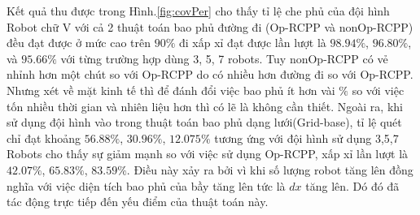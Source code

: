 Kết quả thu được trong Hình.\ref{fig:covPer} cho thấy tỉ lệ che phủ của đội hình Robot chữ V với cả 2 thuật toán bao phủ đường đi (Op-RCPP và nonOp-RCPP) đều đạt được ở mức cao trên $90\%$ đi xấp xỉ đạt được lần lượt là $98.94\%$, $96.80\%$, và $95.66\%$ với từng trường hợp dùng 3, 5, 7 robots. Tuy nonOp-RCPP có vẻ nhỉnh hơn một chút so với Op-RCPP do có nhiều hơn đường đi so với Op-RCPP. Nhưng xét về mặt kinh tế thì để đánh đổi việc bao phủ ít hơn vài $\%$ so với việc tốn nhiều thời gian và nhiên liệu hơn thì có lẽ là không cần thiết. 
Ngoài ra, khi sử dụng đội hình vào trong thuật toán bao phủ dạng lưới(Grid-base), tỉ lệ quét chỉ đạt khoảng $56.88\%$, $30.96\%$, $12.075\%$ tương ứng với đội hình sử dụng 3,5,7 Robots cho thấy sự giảm mạnh so với việc sử dụng Op-RCPP, xấp xỉ lần lượt là $42.07\%$, $65.83\%$, $83.59\%$. Điều này xảy ra bởi vì khi số lượng robot tăng lên đồng nghĩa với việc diện tích bao phủ của bầy tăng lên tức là $dx$ tăng lên. Dó đó đã tác động trực tiếp đến yếu điểm của thuật toán này.


